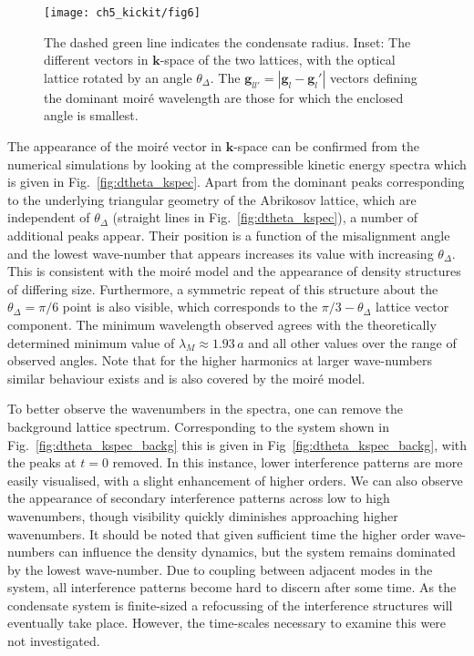 \begin{figure}
    \centering
	\texttt{[image: ch5\_kickit/fig6]}
	\caption[Size of the resulting moir\'e super-structures as a function of the relative angle between the vortex and optical lattice.]{The dashed green line indicates the condensate radius. Inset: The different vectors in $\mathbf{k}$-space of the two lattices, with the optical lattice rotated by an angle $\theta_\Delta$. The $\mathbf{g}_{ll'} = |\mathbf{g}_l - \mathbf{g}_l'|$ vectors defining the dominant moir\'e wavelength are those for which the enclosed angle is smallest. }
	\label{fig:moire_lambda_1}
\end{figure}

    The appearance of the moir\'e vector in $\mathbf{k}$-space can be confirmed from the numerical simulations by looking at the compressible kinetic energy spectra which is given in Fig.~\ref{fig:dtheta_kspec}. Apart from the dominant peaks corresponding to the underlying triangular geometry of the Abrikosov lattice, which are independent of $\theta_\Delta$ (straight lines in Fig.~\ref{fig:dtheta_kspec}), a number of additional peaks appear. Their position is a function of the misalignment angle and the lowest wave-number that appears increases its value with increasing $\theta_\Delta$. This is consistent with the moir\'e model and the appearance of density structures of differing size. Furthermore, a symmetric repeat of this structure about the $\theta_\Delta=\pi/6$ point is also visible, which corresponds to the $\pi/3 - \theta_\Delta$ lattice vector component. The minimum wavelength observed agrees with the theoretically determined minimum value of $\lambda_M\approx 1.93\,a$ and all other values over the range of observed angles. Note that for the higher harmonics at larger wave-numbers similar behaviour exists and is also covered by the moir\'e model.

    To better observe the wavenumbers in the spectra, one can remove the background lattice spectrum. Corresponding to the system shown in Fig.~\ref{fig:dtheta_kspec_backg} this is given in Fig~\ref{fig:dtheta_kspec_backg}, with the peaks at $t=0$ removed. In this instance, lower interference patterns are more easily visualised, with a slight enhancement of higher orders. We can also observe the appearance of secondary interference patterns across low to high wavenumbers, though visibility quickly diminishes approaching higher wavenumbers. It should be noted that given sufficient time the higher order wave-numbers can influence the density dynamics, but the system remains dominated by the lowest wave-number. Due to coupling between adjacent modes in the system, all interference patterns become hard to discern after some time. As the condensate system is finite-sized a refocussing of the interference structures will eventually take place. However, the time-scales necessary to examine this were not investigated.

